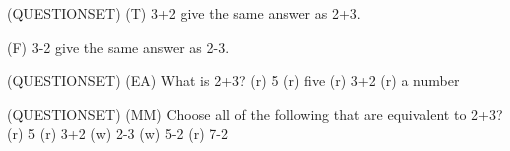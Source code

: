 (QUESTIONSET)
(T) 3+2 give the same answer as 2+3.

(F) 3-2 give the same answer as 2-3.

(QUESTIONSET)
(EA) What is 2+3?
(r) 5
(r) five
(r) 3+2
(r) a number

(QUESTIONSET)
(MM) Choose all of the following that are equivalent to 2+3?
(r) 5
(r) 3+2
(w) 2-3
(w) 5-2
(r) 7-2
